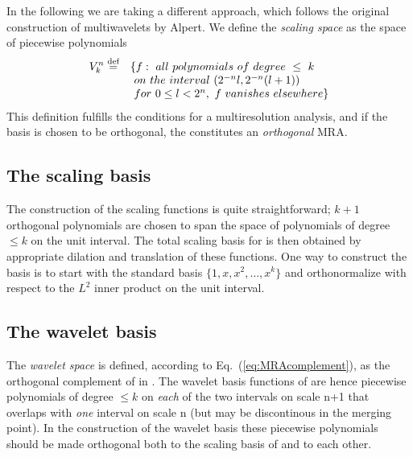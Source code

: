 In the following we are taking a different approach, which follows the original 
construction of multiwavelets by Alpert\cite{Alpert:1993p5460}. We define the 
\emph{scaling space}  as the space of piecewise polynomials
\begin{equation}
    \label{eq:scaling_space_def}
    \begin{array}{rl}
        \displaystyle {V}_{k}^{n} \stackrel{\text{def}}{\hbox{=}} & 
	    \lbrace f:\ all\ polynomials\ of\ degree\ \leq\ k\\ 
	\displaystyle &\ on\ the\ interval\ (2^{-n}l,2^{-n}(l+1))\\
	\displaystyle &\ for\ 0 \leq l < 2^n,\ f\ vanishes\ elsewhere \rbrace
    \end{array}
\end{equation}
This definition fulfills the conditions for a multiresolution analysis, and if the 
basis is chosen to be orthogonal, the  constitutes an \emph{orthogonal} MRA.

\subsection{The scaling basis}
The construction of the scaling functions is quite straightforward; $k+1$ orthogonal 
polynomials are chosen to span the space of polynomials of degree $\leq k$ on the unit 
interval. The total scaling basis for  is then obtained by appropriate dilation 
and translation of these functions. One way to construct the basis is to start with the 
standard basis $\lbrace 1,x,x^2,\dots,x^k\rbrace$ and orthonormalize with respect to 
the $L^2$ inner product on the unit interval.

\subsection{The wavelet basis}
The \emph{wavelet space}  is defined, according to 
Eq.~(\ref{eq:MRAcomplement}), as the orthogonal complement of  
in . The wavelet basis functions of  are hence 
piecewise polynomials of degree $\leq k$ on \emph{each} of the two intervals on 
scale n+1 that overlaps with \emph{one} interval on scale n (but may be 
discontinous in the merging point). In the construction of the wavelet basis 
these piecewise polynomials should be made orthogonal both to the scaling basis 
of  and to each other.

